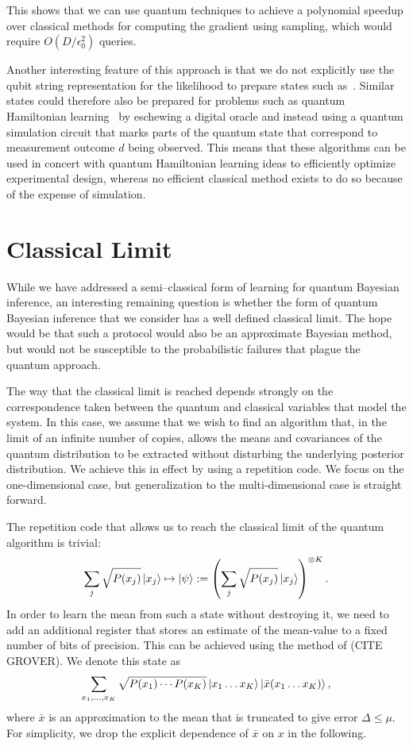 \documentclass[aps,amsmath,onecolumn,amssymb]{revtex4}
\begin{document}
This shows that we can use quantum techniques to achieve a polynomial speedup over classical methods for computing the gradient using sampling, which would require $O(D/\epsilon_0^2)$ queries.  

Another interesting feature of this approach is that we do not explicitly use the qubit string representation for the likelihood to prepare states such as~.   Similar states could therefore also be prepared for problems such as quantum Hamiltonian learning~\cite{WGF+14} by eschewing a digital oracle and instead using a quantum simulation circuit that marks parts of the quantum state that correspond to measurement outcome $d$ being observed.  This means that these algorithms can be used in concert with quantum Hamiltonian learning ideas to efficiently optimize experimental design, whereas no efficient classical method exists to do so because of the expense of simulation.

\section{Classical Limit}
While we have addressed a semi--classical form of learning for quantum Bayesian inference, an interesting remaining question is whether the form of quantum
Bayesian inference that we consider has a well defined classical limit.  The hope would be that such a protocol would also be an approximate Bayesian method, but would not be susceptible to the probabilistic failures that plague the quantum approach.

  The way that the classical limit is reached depends strongly on the correspondence taken between the quantum and classical variables that model the system.  In this case, we assume that we wish to find an algorithm that, in the limit of an infinite number of copies, allows the means and covariances of the quantum distribution to be extracted without disturbing the underlying posterior distribution.  We achieve this in effect by using a repetition code.  We focus on the one-dimensional case, but generalization to the multi-dimensional case is straight forward.

The repetition code that allows us to reach the classical limit of the quantum algorithm is trivial:
\begin{equation}
\sum_{j} \sqrt{P(x_j)} \left|x_j\right\rangle \mapsto \left|\psi\right\rangle:= \left(\sum_j \sqrt{P(x_j)} \left|x_j\right\rangle\right)^{\otimes K}.
\end{equation}
In order to learn the mean from such a state without destroying it, we need to add an additional register that stores an estimate of the mean-value to a fixed number of bits of precision.  This can be achieved using the method of (CITE GROVER).  We denote this state as
\begin{equation}
\sum_{x_1,\ldots,x_K} \sqrt{P(x_1)\cdots P(x_K)} \left|x_1\ldots x_K\right\rangle \left|\bar{x}(x_1\ldots x_K)\right\rangle,
\end{equation}
where $\bar{x}$ is an approximation to the mean that is truncated to give error $\Delta\le \mu$.  For simplicity, we drop the explicit dependence of $\bar{x}$ on $x$ in the following.
\end{document}

